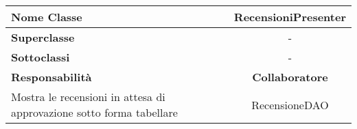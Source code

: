 
\setcounter{table}{0}
\begin{table}[H]
    \centering
    \begin{tabular}{||   l  ||  c   ||}
        \rowcolor{Gray}
        \hline
        \textbf{Nome Classe} & RecensioniPresenter\\
        \hline
        \textbf{Superclasse}  &  - \\
        \hline
        \textbf{Sottoclassi} & - \\
        \hline
        \hline
         \textbf{Responsabilità} & \textbf{Collaboratore} \\
         \hline
          Mostra le recensioni in attesa di approvazione sotto forma tabellare & RecensioneDAO \\
         \hline
    \end{tabular}
\end{table}

    
       
